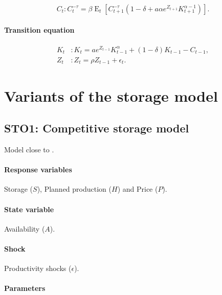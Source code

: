 \documentclass[11pt,fleqn]{article}
\DeclareMathOperator{\E}{E}
\begin{document}
\begin{equation}
  C_{t}: C_{t}^{-\tau}=\beta\E_{t}\left[C_{t+1}^{-\tau}\left(1-\delta+a \alpha e^{Z_{t+1}}K_{t+1}^{\alpha-1}\right)\right].
\end{equation}

\paragraph{Transition equation}

\begin{align}
  K_{t}&: K_{t}=a e^{Z_{t-1}}K_{t-1}^{\alpha}+\left(1-\delta\right)K_{t-1}-C_{t-1},\\
  Z_{t}&: Z_{t}=\rho Z_{t-1}+\epsilon_{t}.
\end{align}

\section{Variants of the storage model}
\label{sec:vari-stor-model}

\subsection{STO1: Competitive storage model}
\label{sec:comp-stor-model}

Model close to \citet{Wrig82}.

\paragraph{Response variables}
\label{sec:response-variables}

Storage ($S$), Planned production ($H$) and Price ($P$).

\paragraph{State variable}
\label{sec:state-variable}

Availability ($A$).

\paragraph{Shock}

Productivity shocks ($\epsilon$).

\paragraph{Parameters}
\end{document}
